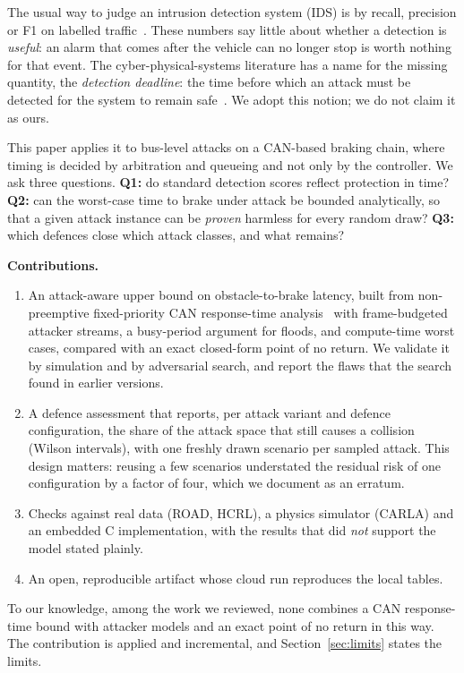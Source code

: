 \documentclass[conference]{IEEEtran}
\begin{document}
The usual way to judge an intrusion detection system (IDS) is by recall, precision or F1 on labelled traffic~\cite{stachowski2019}. These numbers say little about whether a detection is \emph{useful}: an alarm that comes after the vehicle can no longer stop is worth nothing for that event. The cyber-physical-systems literature has a name for the missing quantity, the \emph{detection deadline}: the time before which an attack must be detected for the system to remain safe~\cite{akowuah2021,zhang2020}. We adopt this notion; we do not claim it as ours.

This paper applies it to bus-level attacks on a CAN-based braking chain, where timing is decided by arbitration and queueing and not only by the controller. We ask three questions. \textbf{Q1:} do standard detection scores reflect protection in time? \textbf{Q2:} can the worst-case time to brake under attack be bounded analytically, so that a given attack instance can be \emph{proven} harmless for every random draw? \textbf{Q3:} which defences close which attack classes, and what remains?

\textbf{Contributions.}
\begin{enumerate}
\item An attack-aware upper bound on obstacle-to-brake latency, built from non-preemptive fixed-priority CAN response-time analysis~\cite{davis2007} with frame-budgeted attacker streams, a busy-period argument for floods, and compute-time worst cases, compared with an exact closed-form point of no return. We validate it by simulation and by adversarial search, and report the flaws that the search found in earlier versions.
\item A defence assessment that reports, per attack variant and defence configuration, the share of the attack space that still causes a collision (Wilson intervals), with one freshly drawn scenario per sampled attack. This design matters: reusing a few scenarios understated the residual risk of one configuration by a factor of four, which we document as an erratum.
\item Checks against real data (ROAD, HCRL), a physics simulator (CARLA) and an embedded C implementation, with the results that did \emph{not} support the model stated plainly.
\item An open, reproducible artifact whose cloud run reproduces the local tables.
\end{enumerate}
To our knowledge, among the work we reviewed, none combines a CAN response-time bound with attacker models and an exact point of no return in this way. The contribution is applied and incremental, and Section~\ref{sec:limits} states the limits.
\end{document}
